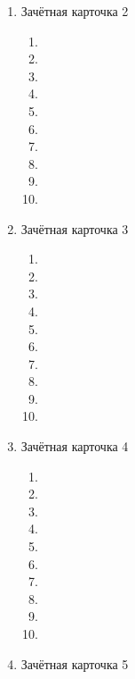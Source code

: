 \documentclass[12pt, a4paper]{article}
\begin{document}
\begin{enumerate}
\begin{enumerate}[label=\asbuk*)]
		\item 
		\item 
		\item 
		\item 
		\item 
		\item 
		\item 
		\item 
	\end{enumerate}
	\item Зачётная карточка 2
	\begin{enumerate}[label=\asbuk*)]
		\item 
		\item 
		\item 
		\item 
		\item 
		\item 
		\item 
		\item 
		\item 
		\item 
	\end{enumerate}
	\item Зачётная карточка 3
	\begin{enumerate}[label=\asbuk*)]
		\item 
		\item 
		\item 
		\item 
		\item 
		\item 
		\item 
		\item 
		\item 
		\item 
	\end{enumerate}
	\item Зачётная карточка 4
	\begin{enumerate}[label=\asbuk*)]
		\item 
		\item 
		\item 
		\item 
		\item 
		\item
		\item 
		\item 
		\item 
		\item 
	\end{enumerate}
	\item Зачётная карточка 5
	\begin{enumerate}[label=\asbuk*)]

\end{enumerate}
\end{enumerate}
\end{document}

